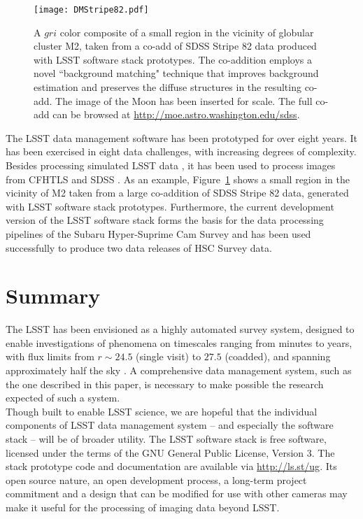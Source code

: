 \documentclass[11pt,twoside]{article}
\begin{document}
\begin{figure}[!t]
%
%
\texttt{[image: DMStripe82.pdf]}
\caption{
A $gri$ color composite of a small region in the vicinity of globular cluster M2, taken from a co-add of
SDSS Stripe 82 data produced with LSST software stack prototypes.  The
co-addition employs a novel ``background matching" technique
\citep{2014MNRAS.440.1296H} that improves
background estimation and preserves the diffuse structures in the resulting
co-add. The image of the Moon has been inserted for scale. The full
co-add can be browsed at \url{http://moe.astro.washington.edu/sdss}.}
\label{Fig:DMStripe82}
\end{figure}


The LSST data management software has been prototyped for over eight
years. It has been exercised in eight data challenges, with increasing
degrees of complexity. Besides processing simulated LSST data
\citep{2014SPIE.9150E..14C, 0067-0049-218-1-14}, it
has been used to process images from CFHTLS
and SDSS \citep{2009ApJS..182..543A}. As an example,
Figure~\ref{Fig:DMStripe82} shows a small region in the vicinity of M2
taken from a large co-addition of SDSS Stripe 82 data, generated with LSST
software stack prototypes. Furthermore, the current development version
of the LSST software stack forms the basis for the data processing pipelines
of the Subaru Hyper-Suprime Cam Survey \citep{2012SPIE.8446E..0ZM} and
has been used successfully to produce two data releases of HSC Survey data.
\\

\section{               Summary              }
\label{sec:summary}

The LSST has been envisioned as a highly automated survey system,
designed to enable investigations of phenomena on timescales ranging
from minutes to years, with flux limits from $r \sim 24.5$ (single visit)
to $27.5$ (coadded), and spanning approximately half the sky
\citep{2009arXiv0912.0201L}. A comprehensive data management system,
such as the one described in this paper, is necessary to make possible
the research expected of such a system.
\\

Though built to enable LSST science, we are hopeful that the individual
components of LSST data management system -- and especially the software
stack -- will be of broader utility.  The LSST software stack is free
software, licensed under the terms of the GNU General Public License,
Version 3.  The stack prototype code and documentation are available via
\url{http://ls.st/ug}.  Its open source nature, an open development process,
a long-term project commitment and a design that can be modified for use
with other cameras may make it useful for the processing of imaging data
beyond LSST.
\\
\end{document}
